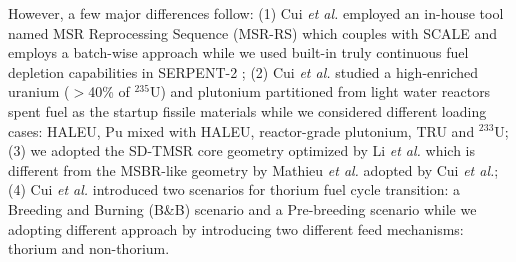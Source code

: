 \documentclass[answers,11pt]{exam}
\begin{document}
\begin{questions}
\begin{solution}
                However, a few major differences follow: 
                (1) Cui \emph{et al.} employed an in-house tool named MSR 
                Reprocessing 
                Sequence (MSR-RS) \cite{ZOU2015114} which couples with SCALE 
                and employs a 
                batch-wise approach while we used built-in truly continuous 
                fuel depletion 
                capabilities in SERPENT-2 \cite{aufiero2013extended}; 
                (2) Cui \emph{et al.} studied a high-enriched uranium ($>$40\% 
                of $^{235}$U) 
                and plutonium partitioned from light water reactors spent fuel 
                as the startup 
                fissile materials while we considered different loading cases: 
                HALEU, Pu 
                mixed with HALEU, reactor-grade plutonium, TRU and $^{233}$U;
                (3) we adopted the SD-TMSR core geometry optimized by Li 
                \emph{et al.} 
                \cite{li_optimization_2018} which is different from the 
                MSBR-like geometry by 
                Mathieu \emph{et al.} \cite{mathieu_possible_2009} adopted by 
                Cui \emph{et 
                	al.}; 
                (4) Cui \emph{et al.} introduced two scenarios for thorium 
                fuel cycle 
                transition: a Breeding and Burning (B\&B) scenario and a 
                Pre-breeding scenario 
                while we adopting different approach by introducing two 
                different feed 
                mechanisms: thorium and non-thorium.
                

\end{solution}
\end{questions}
\end{document}
